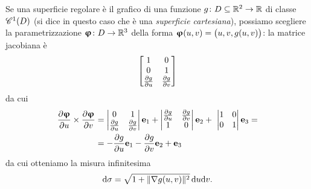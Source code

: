 Se una superficie regolare è il grafico di una funzione $g\colon D\subseteq\R^2\to\R$ di classe $\cont[1]{D}$ (si dice in questo caso che è una \emph{superficie cartesiana}), possiamo scegliere la parametrizzazione $\vphi\colon D\to\R^3$ della forma $\vphi(u,v)=\big(u,v,g(u,v)\big)$: la matrice jacobiana è
\begin{equation}
	\begin{bmatrix}
		1&0\\
		0&1\\
		\drp{g}{u}&\drp{g}{v}
	\end{bmatrix}
\end{equation}
da cui
\begin{equation}
	\begin{split}
		\drp{\vphi}{u}\times\drp{\vphi}{v}&=
		\begin{vmatrix}
			0&1\\
			\drp{g}{u}&\drp{g}{v}
		\end{vmatrix}
		\vec e_1+
		\begin{vmatrix}
			\drp{g}{u}&\drp{g}{v}\\
			1&0
		\end{vmatrix}
		\vec e_2+\
		\begin{vmatrix}
			1&0\\
			0&1
		\end{vmatrix}
		\vec e_3=\\
		&=-\drp{g}{u}\vec e_1-\drp{g}{v}\vec e_2+\vec e_3
	\end{split}
	\label{eq:versore-normale-superficie-cartesiana}
\end{equation}
da cui otteniamo la misura infinitesima
\begin{equation}
	\dd\sigma=\sqrt{1+\norm{\grad g(u,v)}^2}\,\dd u\dd v.
\end{equation}

